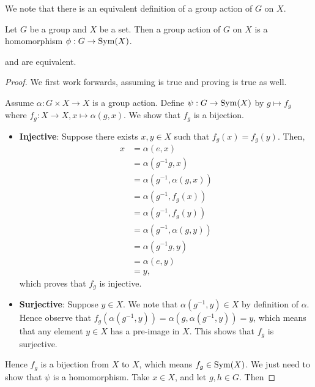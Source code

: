 We note that there is an equivalent definition of a group action of $G$ on $X$.
\begin{definition}\label{definition-group-action-alt}
    Let $G$ be a group and $X$ be a set. Then a group action of $G$ on $X$ is a homomorphism $\phi: G\to \mathrm{Sym}(X)$.
\end{definition}
\begin{theorem}\label{thrm-group-action-definition-equivalence}
     and  are equivalent.
\end{theorem}
\begin{proof}
    We first work forwards, assuming  is true and proving  is true as well.
    
    Assume $\alpha: G \times X \to X$ is a group action. Define $\psi: G \to \mathrm{Sym}(X)$ by $g \mapsto f_g$ where $f_g: X \to X, x \mapsto \alpha(g, x)$. We show that $f_g$ is a bijection.
    \begin{itemize}
        \item \textbf{Injective}: Suppose there exists $x, y \in X$ such that $f_g(x) = f_g(y)$. Then,
        \begin{align*}
            x &= \alpha(e, x)\\
            &= \alpha(g^{-1}g, x)\\
            &= \alpha(g^{-1}, \alpha(g, x))\\
            &= \alpha(g^{-1}, f_g(x))\\
            &= \alpha(g^{-1}, f_g(y))\\
            &= \alpha(g^{-1}, \alpha(g, y))\\
            &= \alpha(g^{-1}g, y)\\
            &= \alpha(e, y)\\
            &= y,
        \end{align*}
        which proves that $f_g$ is injective.
        \item \textbf{Surjective}: Suppose $y \in X$. We note that $\alpha(g^{-1}, y) \in X$ by definition of $\alpha$. Hence observe that $f_g(\alpha(g^{-1}, y)) = \alpha(g, \alpha(g^{-1}, y)) = y$, which means that any element $y \in X$ has a pre-image in $X$. This shows that $f_g$ is surjective.
    \end{itemize}
    Hence $f_g$ is a bijection from $X$ to $X$, which means $f_g \in \mathrm{Sym}(X)$. We just need to show that $\psi$ is a homomorphism. Take $x \in X$, and let $g, h \in G$. Then

\end{proof}
